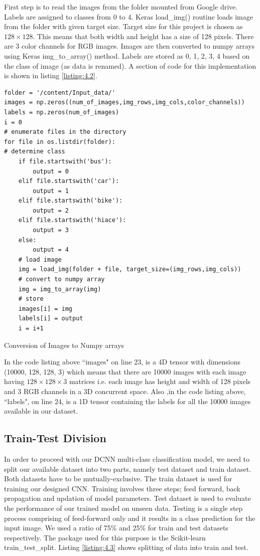 First step is to read the images from the folder mounted from Google drive.
Labels are assigned to classes from 0 to 4. Keras load\_img() routine loads image
from the folder with given target size. Target size for this project is chosen as
$128 \times 128$. This means that both width and height has a size of 128 pixels.
There are 3 color channels for RGB images. Images are then converted to numpy arrays using
Keras img\_to\_array() method. Labels are stored as 0, 1, 2, 3, 4 based on the class of image (as data is renamed).
A section of code for this implementation is shown in listing \ref{listing:4.2}.

\begin{longlisting}
    \begin{verbatim}
folder = '/content/Input_data/'
images = np.zeros((num_of_images,img_rows,img_cols,color_channels))
labels = np.zeros(num_of_images)
i = 0
# enumerate files in the directory
for file in os.listdir(folder):
# determine class
    if file.startswith('bus'):
        output = 0
    elif file.startswith('car'):
        output = 1
    elif file.startswith('bike'):
        output = 2
    elif file.startswith('hiace'):
        output = 3
    else:
        output = 4
    # load image
    img = load_img(folder + file, target_size=(img_rows,img_cols))
    # convert to numpy array
    img = img_to_array(img)
    # store
    images[i] = img
    labels[i] = output
    i = i+1
\end{verbatim}
\caption{Conversion of Images to Numpy arrays}
\label{listing:4.2}
\end{longlisting}
In the code listing above ``images" on line 23, is a 4D tensor with
dimensions (10000, 128, 128, 3) which means that there are 10000
images with each image having $128\times 128\times 3$ matrices i.e.
each image has height and width of 128 pixels and 3 RGB channels in a
3D concurrent space. Also ,in the code listing above,
``labels", on line 24, is a 1D tensor containing the labels
for all the 10000 images available in our dataset.
\subsection{Train-Test Division}
In order to proceed with our DCNN multi-class classification model,
we need to split our available dataset into two parts, namely test 
dataset and train dataset. Both datasets have to be mutually-exclusive.
The train dataset is used for training our designed CNN.
Training involves three steps; feed forward, back propagation and
updation of model parameters. Test dataset is used to evaluate the performance
of our trained model on unseen data. Testing is a single step process
comprising of feed-forward only and it results in a  class
prediction for the input image. We used a ratio of 75\% and
25\% for train and test datasets respectively. The package used for this purpose is the
Scikit-learn train\_test\_split. Listing \ref{listing:4.3} shows splitting of
data into train and test.

